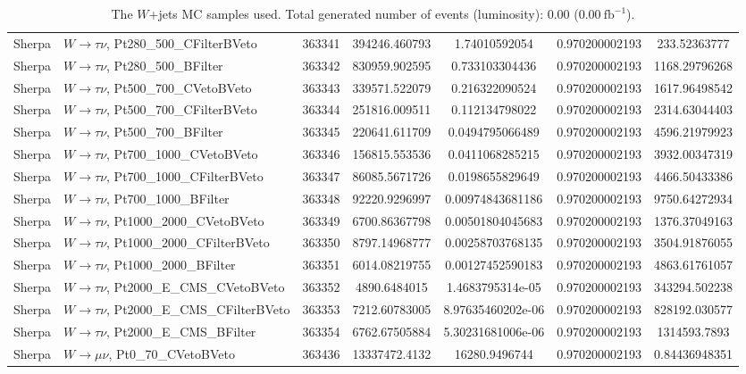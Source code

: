 \begin{table}[h]
\begin{center}
\begin{tabular}{|l|l|c|
S[table-parse-only, round-precision=4]|
S[table-parse-only, round-precision=3]|
S[table-parse-only, round-precision=3]|
S[table-parse-only, round-precision=3]|
}
Sherpa & $W\rightarrow\tau\nu$, Pt280\_500\_CFilterBVeto & 363341 & 394246.460793 & 1.74010592054 & 0.970200002193 & 233.52363777 \\
Sherpa & $W\rightarrow\tau\nu$, Pt280\_500\_BFilter & 363342 & 830959.902595 & 0.733103304436 & 0.970200002193 & 1168.29796268 \\
Sherpa & $W\rightarrow\tau\nu$, Pt500\_700\_CVetoBVeto & 363343 & 339571.522079 & 0.216322090524 & 0.970200002193 & 1617.96498542 \\
Sherpa & $W\rightarrow\tau\nu$, Pt500\_700\_CFilterBVeto & 363344 & 251816.009511 & 0.112134798022 & 0.970200002193 & 2314.63044403 \\
Sherpa & $W\rightarrow\tau\nu$, Pt500\_700\_BFilter & 363345 & 220641.611709 & 0.0494795066489 & 0.970200002193 & 4596.21979923 \\
Sherpa & $W\rightarrow\tau\nu$, Pt700\_1000\_CVetoBVeto & 363346 & 156815.553536 & 0.0411068285215 & 0.970200002193 & 3932.00347319 \\
Sherpa & $W\rightarrow\tau\nu$, Pt700\_1000\_CFilterBVeto & 363347 & 86085.5671726 & 0.0198655829649 & 0.970200002193 & 4466.50433386 \\
Sherpa & $W\rightarrow\tau\nu$, Pt700\_1000\_BFilter & 363348 & 92220.9296997 & 0.00974843681186 & 0.970200002193 & 9750.64272934 \\
Sherpa & $W\rightarrow\tau\nu$, Pt1000\_2000\_CVetoBVeto & 363349 & 6700.86367798 & 0.00501804045683 & 0.970200002193 & 1376.37049163 \\
Sherpa & $W\rightarrow\tau\nu$, Pt1000\_2000\_CFilterBVeto & 363350 & 8797.14968777 & 0.00258703768135 & 0.970200002193 & 3504.91876055 \\
Sherpa & $W\rightarrow\tau\nu$, Pt1000\_2000\_BFilter & 363351 & 6014.08219755 & 0.00127452590183 & 0.970200002193 & 4863.61761057 \\
Sherpa & $W\rightarrow\tau\nu$, Pt2000\_E\_CMS\_CVetoBVeto & 363352 & 4890.6484015 & 1.4683795314e-05 & 0.970200002193 & 343294.502238 \\
Sherpa & $W\rightarrow\tau\nu$, Pt2000\_E\_CMS\_CFilterBVeto & 363353 & 7212.60783005 & 8.97635460202e-06 & 0.970200002193 & 828192.030577 \\
Sherpa & $W\rightarrow\tau\nu$, Pt2000\_E\_CMS\_BFilter & 363354 & 6762.67505884 & 5.30231681006e-06 & 0.970200002193 & 1314593.7893 \\
Sherpa & $W\rightarrow\mu\nu$, Pt0\_70\_CVetoBVeto & 363436 & 13337472.4132 & 16280.9496744 & 0.970200002193 & 0.84436948351 \\
\bottomrule
\end{tabular}
\caption{The $W$+jets MC samples used. Total generated number of events (luminosity): 0.00 (0.00$~\mathrm{fb}^{-1}$).}
\label{tab:app:datamcW_sherpa_220}
\end{center}
\end{table}
